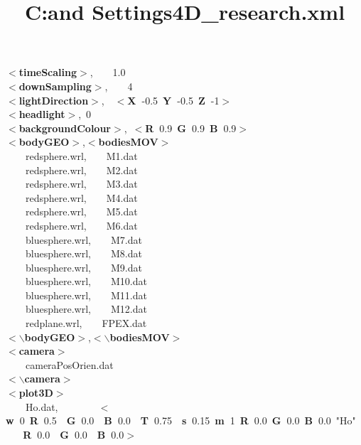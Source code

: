 \documentclass{article}
\title{C:\Documents and Settings\mjhmilla\DynaFlexAnimation\Solvere4D\Manual\source\fpe_research.xml}
\newcommand{\hlstd}[1]{\textcolor[rgb]{0,0,0}{#1}}
\newcommand{\hlkey}[1]{\textcolor[rgb]{0,0,1}{\bf{#1}}}
\newcommand{\hlnum}[1]{\textcolor[rgb]{0.66,0,0.66}{#1}}
\newcommand{\hlstr}[1]{\textcolor[rgb]{1,0,0}{#1}}
\begin{document}
\pagecolor{bgcolor}
\noindent
\ttfamily
\hlstd{}\hlkey{$<$timeScaling$>$}\hlstd{,\hlstd{\ \ \ \ }}\hlnum{1.0\\
}\hlstd{}\hlkey{$<$downSampling$>$}\hlstd{,\hlstd{\ \ \ \ }}\hlnum{4\\
}\hlstd{}\hlkey{$<$lightDirection$>$}\hlstd{,\hlstd{\ \ }}\hlkey{$<$X\ }\hlnum{-0.5\ }\hlkey{Y\ }\hlnum{-0.5\ }\hlkey{Z\ }\hlnum{-1}\hlkey{$>$}\hlstd{\\
}\hlkey{$<$headlight$>$}\hlstd{,\ }\hlnum{0\\
}\hlstd{}\hlkey{$<$backgroundColour$>$}\hlstd{,\ }\hlkey{$<$R\ }\hlnum{0.9\ }\hlkey{G\ }\hlnum{0.9\ }\hlkey{B\ }\hlnum{0.9}\hlkey{$>$}\hlstd{\\
}\hlkey{$<$bodyGEO$>$}\hlstd{,}\hlkey{$<$bodiesMOV$>$}\hlstd{\\
\hlstd{\ \ \ \ }redsphere.wrl,\hlstd{\ \ \ \ }M1.dat\\
\hlstd{\ \ \ \ }redsphere.wrl,\hlstd{\ \ \ \ }M2.dat\\
\hlstd{\ \ \ \ }redsphere.wrl,\hlstd{\ \ \ \ }M3.dat\\
\hlstd{\ \ \ \ }redsphere.wrl,\hlstd{\ \ \ \ }M4.dat\\
\hlstd{\ \ \ \ }redsphere.wrl,\hlstd{\ \ \ \ }M5.dat\\
\hlstd{\ \ \ \ }redsphere.wrl,\hlstd{\ \ \ \ }M6.dat\\
\hlstd{\ \ \ \ }bluesphere.wrl,\hlstd{\ \ \ \ }M7.dat\\
\hlstd{\ \ \ \ }bluesphere.wrl,\hlstd{\ \ \ \ }M8.dat\\
\hlstd{\ \ \ \ }bluesphere.wrl,\hlstd{\ \ \ \ }M9.dat\\
\hlstd{\ \ \ \ }bluesphere.wrl,\hlstd{\ \ \ \ }M10.dat\\
\hlstd{\ \ \ \ }bluesphere.wrl,\hlstd{\ \ \ \ }M11.dat\\
\hlstd{\ \ \ \ }bluesphere.wrl,\hlstd{\ \ \ \ }M12.dat\\
\hlstd{\ \ \ \ }redplane.wrl,\hlstd{\ \ \ \ }FPEX.dat\\
}\hlkey{$<$$\backslash$bodyGEO$>$}\hlstd{,}\hlkey{$<$$\backslash$bodiesMOV$>$}\hlstd{\\
}\hlkey{$<$camera$>$}\hlstd{\\
\hlstd{\ \ \ \ }cameraPosOrien.dat\\
}\hlkey{$<$$\backslash$camera$>$}\hlstd{\\
}\hlkey{$<$plot3D$>$}\hlstd{\\
\hlstd{\ \ \ \ }Ho.dat,\hlstd{\ \ \ \ \ \ \ \ }}\hlkey{$<$w\ }\hlnum{0\ }\hlkey{R\ }\hlnum{0.5\hlstd{\ \ }}\hlkey{G\ }\hlnum{0.0\hlstd{\ \ }}\hlkey{B\ }\hlnum{0.0\hlstd{\ \ }}\hlkey{T\ }\hlnum{0.75\hlstd{\ \ }}\hlkey{s\ }\hlnum{0.15\ }\hlkey{m\ }\hlnum{1\ }\hlkey{R\ }\hlnum{0.0\ }\hlkey{G\ }\hlnum{0.0\ }\hlkey{B\ }\hlnum{0.0\ }\hlkey{}\hlstr{"Ho"}\hlkey{\hlstd{\ \ \ \ }R\ }\hlnum{0.0\hlstd{\ \ }}\hlkey{G\ }\hlnum{0.0\hlstd{\ \ }}\hlkey{B\ }\hlnum{0.0}\hlkey{$>$}\hlstd{\\
}
\end{document}

